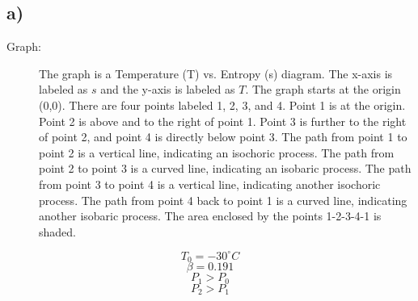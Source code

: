 

\subsection*{a)}

\begin{description}
    \item[Graph:] The graph is a Temperature (T) vs. Entropy (s) diagram. The x-axis is labeled as $s$ and the y-axis is labeled as $T$. The graph starts at the origin (0,0). There are four points labeled 1, 2, 3, and 4. Point 1 is at the origin. Point 2 is above and to the right of point 1. Point 3 is further to the right of point 2, and point 4 is directly below point 3. The path from point 1 to point 2 is a vertical line, indicating an isochoric process. The path from point 2 to point 3 is a curved line, indicating an isobaric process. The path from point 3 to point 4 is a vertical line, indicating another isochoric process. The path from point 4 back to point 1 is a curved line, indicating another isobaric process. The area enclosed by the points 1-2-3-4-1 is shaded.
\end{description}

\[
T_0 = -30^\circ C
\]
\[
\beta = 0.191
\]
\[
P_1 > P_0
\]
\[
P_2 > P_1
\]